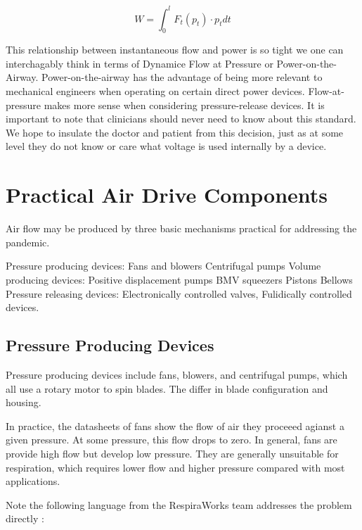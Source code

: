 \documentclass[conference]{article}
\begin{document}
\begin{equation}
  W = \int_{0}^{l} F_t(p_t)\cdot p_t dt
  \end{equation}

This relationship between instantaneous flow and power is so tight we one can interchagably think in terms of
Dynamice Flow at Pressure or Power-on-the-Airway.
Power-on-the-airway has the advantage of being
more relevant to mechanical engineers when operating on certain direct power devices.
Flow-at-pressure makes more sense when considering pressure-release devices.
It is important to note that clinicians
should never need to know about this standard. We hope to insulate the doctor and
patient from this decision, just as at some level they do not know or care what voltage
is used internally by a device.

\section{Practical Air Drive Components}

Air flow may be produced by three basic mechanisms practical for addressing the pandemic.

\begin{outline}
  \1 Pressure producing devices:
  \2 Fans and blowers
  \2 Centrifugal pumps
  \1 Volume producing devices:
  \2 Positive displacement pumps
  \2 BMV squeezers
  \2 Pistons
  \2 Bellows
  \1 Pressure releasing devices:
  \2 Electronically controlled valves,
  \2 Fulidically controlled devices.
\end{outline}


\subsection{Pressure Producing Devices}

Pressure producing devices include fans, blowers, and centrifugal pumps, which
all use a rotary motor to spin blades. The differ in blade configuration and
housing.

In practice, the datasheets of fans show the flow of air they proceeed agianst a given pressure. At some pressure,
this flow drops to zero. In general, fans are provide high flow but develop low pressure. They are generally unsuitable
for respiration, which requires lower flow and higher pressure
compared with most applications.


Note the following language from the RespiraWorks team addresses the problem directly \cite{respiraworks}:
\end{document}

